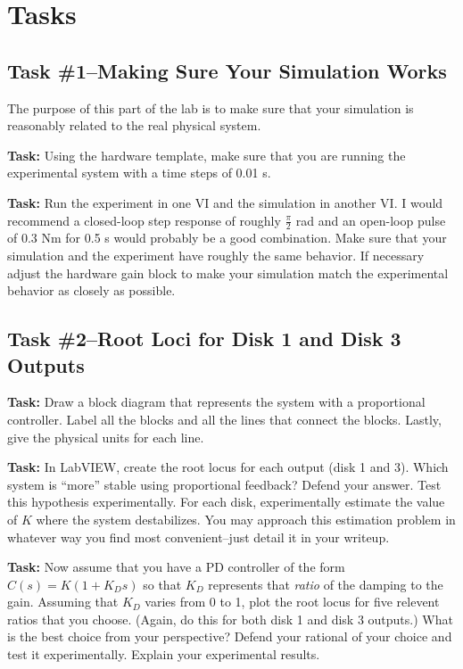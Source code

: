 \section{Tasks}

\subsection{Task \#1--Making Sure Your Simulation Works}

The purpose of this part of the lab is to make sure that your simulation is
reasonably related to the real physical system.  

\noindent \textbf{Task:}  Using the hardware template, make sure that you are 
running the experimental system with a time steps of 0.01 s.

\noindent \textbf{Task:}  Run the experiment in one VI and  the simulation in 
another VI.  I would recommend a closed-loop step response of roughly
$\frac{\pi}{2}$ rad and an open-loop pulse of 0.3 Nm for 0.5 s would probably be a
good combination.  Make sure that your simulation and the experiment
have roughly the same behavior.  If necessary adjust the hardware gain
block to make your simulation match the experimental behavior as
closely as possible.

\subsection{Task \#2--Root Loci for Disk 1 and Disk 3 Outputs}

\noindent \textbf{Task:} Draw a block diagram that represents the system with a
proportional controller.  Label all the blocks and all the lines that connect
the blocks.  Lastly, give the physical units for each line.  

\noindent \textbf{Task:} In LabVIEW, create the root locus for each output (disk 1  and
3).  Which system is ``more'' stable using proportional feedback?  Defend your
answer.  Test this hypothesis experimentally.  For each disk, experimentally
estimate the value of $K$ where the system destabilizes.  You may approach this
estimation problem in whatever way you find most convenient--just detail it in
your writeup.

\noindent \textbf{Task:} Now assume that you have a PD controller of the form
$C(s)=K(1+K_Ds)$ so that $K_D$ represents that \emph{ratio} of the damping to
the gain.  Assuming that $K_D$ varies from 0 to 1, plot the root locus for five
relevent ratios that you choose.  (Again, do this for both disk 1 and disk 3
outputs.)  What is the best choice from your perspective?  Defend your rational
of your choice and test it experimentally.  Explain your experimental results.

